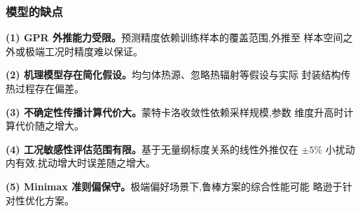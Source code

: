 \subsubsection{模型的缺点}

\textbf{(1) GPR 外推能力受限。}预测精度依赖训练样本的覆盖范围,外推至
样本空间之外或极端工况时精度难以保证。

\textbf{(2) 机理模型存在简化假设。}均匀体热源、忽略热辐射等假设与实际
封装结构传热过程存在偏差。

\textbf{(3) 不确定性传播计算代价大。}蒙特卡洛收敛性依赖采样规模,参数
维度升高时计算代价随之增大。

\textbf{(4) 工况敏感性评估范围有限。}基于无量纲标度关系的线性外推仅在
$\pm 5\%$ 小扰动内有效,扰动增大时误差随之增大。

\textbf{(5) Minimax 准则偏保守。}极端偏好场景下,鲁棒方案的综合性能可能
略逊于针对性优化方案。
